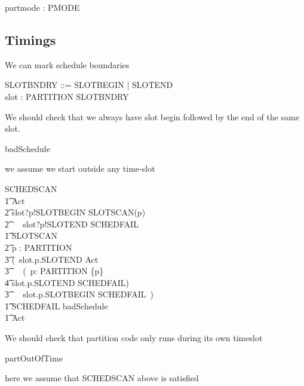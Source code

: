 \begin{circus}
	\circchannel partmode : PMODE
\end{circus}
\subsection{Timings}
  We can mark schedule boundaries

\begin{circus}
	SLOTBNDRY ::= SLOTBEGIN | SLOTEND\\
	\circchannel slot : PARTITION \cross SLOTBNDRY
\end{circus}

We should check that we always have slot begin followed by the end of the
same slot.
\begin{circus}

\circchannel badSchedule
\end{circus}
we assume we start outside any time-slot
\begin{circus}
\circprocess SCHEDSCAN \circdef \circbegin
\\ \t1 Act \circdef
\\ \t2 slot?p!SLOTBEGIN \then  SLOTSCAN(p)
\\ \t2 ~\extchoice~  slot?p!SLOTEND   \then  SCHEDFAIL
\\ \t1 SLOTSCAN \circdef
\\ \t2 \circvar p : PARTITION \circspot
\\ \t3 (~slot.p.SLOTEND   \then  Act
\\ \t3 ~\extchoice~  (~\Extchoice  p: PARTITION \cap \{p\} \circspot
\\ \t4   slot.p.SLOTEND \then  SCHEDFAIL)
\\ \t3 ~\extchoice~  slot.p.SLOTBEGIN \then  SCHEDFAIL~)
\\ \t1 SCHEDFAIL \circdef badSchedule \then \Stop
\\ \t1 \circspot Act
\\\circend
\end{circus}
We should check that partition code only runs during its own timeslot
\begin{circus}

\circchannel partOutOfTime
\end{circus}
here we assume that SCHEDSCAN above is satisfied
